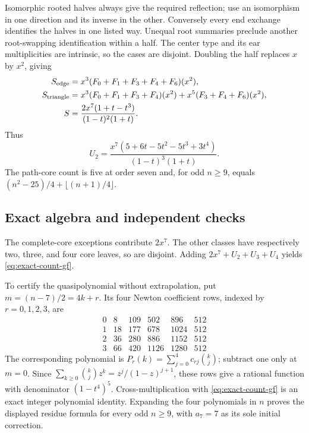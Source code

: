 Isomorphic rooted halves always give the required reflection;
use an isomorphism in one direction and its inverse in the
other.  Conversely every end exchange identifies the halves
in one listed way.  Unequal root summaries preclude another
root-swapping identification within a half.  The center type
and its ear multiplicities are intrinsic, so the cases are
disjoint.  Doubling the half replaces $x$ by $x^2$, giving
\begin{align*}
 S_{\rm edge}&=x^3(F_0+F_1+F_3+F_4+F_6)(x^2),\\
 S_{\rm triangle}&=x^3(F_0+F_1+F_3+F_4)(x^2)
                  +x^5(F_3+F_4+F_6)(x^2),\\
 S&=\frac{2x^7(1+t-t^3)}{(1-t)^2(1+t)}.
\end{align*}
Thus
\begin{equation}
 U_2=\frac{x^7(5+6t-5t^2-5t^3+3t^4)}{(1-t)^3(1+t)}.
 \label{eq:count-u2}
\end{equation}
The path-core count is five at order seven and, for odd $n\ge9$,
equals $(n^2-25)/4+\lfloor(n+1)/4\rfloor$.

\subsection{Exact algebra and independent checks}

The complete-core exceptions contribute $2x^7$.  The other
classes have respectively two, three, and four core leaves,
so are disjoint.  Adding $2x^7+U_2+U_3+U_4$ yields
\eqref{eq:exact-count-gf}.

To certify the quasipolynomial without extrapolation, put
$m=(n-7)/2=4k+r$.  Its four Newton coefficient rows, indexed
by $r=0,1,2,3$, are
\[
\begin{array}{c|rrrrr}
0&8&109&502&896&512\\
1&18&177&678&1024&512\\
2&36&280&886&1152&512\\
3&66&420&1126&1280&512
\end{array}
\]
The corresponding polynomial is
$P_r(k)=\sum_{j=0}^4c_{rj}\binom{k}{j}$; subtract one only
at $m=0$.  Since
$\sum_{k\ge0}\binom{k}{j}z^k=z^j/(1-z)^{j+1}$, these rows
give a rational function with denominator $(1-t^4)^5$.
Cross-multiplication with \eqref{eq:exact-count-gf} is an
exact integer polynomial identity.  Expanding the four
polynomials in $n$ proves the displayed residue formula for
every odd $n\ge9$, with $a_7=7$ as its sole initial correction.

